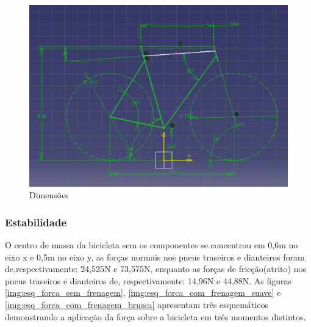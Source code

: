 			\graphicspath{{figuras/}}
			\begin{figure}[h!]
			\centering
			\includegraphics[scale=0.80]{dimensoes.png}
			\caption{Dimensões}
			\label{img:dimensoes}
			\end{figure}

	\subsubsection{Estabilidade}
	O centro de massa da bicicleta sem os componentes se concentrou em 0,6m no eixo x e 0,5m no eixo y, as forças normais nos pneus traseiros e dianteiros foram de,respectivamente: 24,525N e 73,575N, enquanto as forças de fricção(atrito)  nos pneus traseiros e dianteiros de, respectivamente: 14,96N e 44,88N. As figuras \ref{img:esq_forca_sem_frenagem}, \ref{img:esq_forca_com_frenagem_suave} e \ref{img:esq_forca_com_frenagem_brusca} apresentam três esquemáticos demonstrando a aplicação da força sobre a bicicleta em três momentos distintos.

